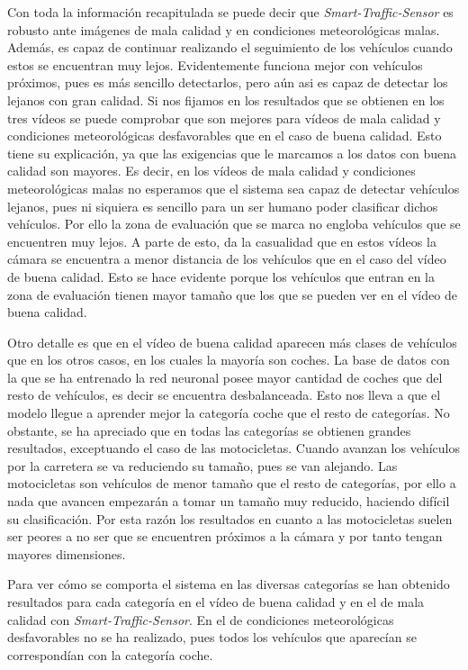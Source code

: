 Con toda la información recapitulada se puede decir que \textit{Smart-Traffic-Sensor} es robusto ante imágenes de mala calidad y en condiciones meteorológicas malas. Además, es capaz de continuar realizando el seguimiento de los vehículos cuando estos se encuentran muy lejos.
Evidentemente funciona mejor con vehículos próximos, pues es más sencillo detectarlos, pero aún asi es  capaz de detectar los lejanos con gran calidad. 
Si nos fijamos en los resultados que se obtienen en los tres vídeos se puede comprobar que son mejores para vídeos de mala calidad y condiciones meteorológicas desfavorables que en el caso de buena calidad. Esto tiene su explicación, ya que las exigencias que le marcamos a los datos con buena calidad son mayores. Es decir, en los vídeos de mala calidad y condiciones meteorológicas malas  no esperamos que el sistema sea capaz de detectar vehículos lejanos, pues ni siquiera es sencillo para un ser humano poder clasificar dichos vehículos. Por ello la zona de evaluación que se marca no engloba vehículos que se encuentren muy lejos. A parte de esto, da la casualidad que en estos vídeos la cámara se encuentra a menor distancia de los vehículos que en el caso del vídeo de buena calidad. Esto se hace evidente porque los vehículos que entran en la zona de evaluación tienen mayor tamaño que los que se pueden ver en el vídeo de buena calidad.

Otro detalle es que en el vídeo de buena calidad aparecen más clases de vehículos que en los otros casos, en los cuales la mayoría son coches. La base de datos con la que se ha entrenado la red neuronal posee mayor cantidad de coches que del resto de vehículos, es decir se encuentra desbalanceada. Esto nos lleva a que el modelo llegue a aprender mejor la categoría coche que el resto de categorías. No obstante, se ha apreciado que en todas las categorías se obtienen grandes resultados, exceptuando el caso de las motocicletas. Cuando avanzan los vehículos por la carretera se va reduciendo su tamaño, pues se van alejando. Las motocicletas son vehículos de menor tamaño que el resto de categorías, por ello a nada que avancen empezarán a tomar un tamaño muy reducido, haciendo difícil su clasificación. Por esta razón los resultados en cuanto a las motocicletas suelen ser peores a no ser que se encuentren próximos a la cámara y por tanto tengan mayores dimensiones.

Para ver cómo se comporta el sistema en las diversas categorías se han obtenido resultados para cada categoría en el vídeo de buena calidad y en el de mala calidad con \textit{Smart-Traffic-Sensor}. En el de condiciones meteorológicas desfavorables no se ha realizado, pues todos los vehículos que aparecían se correspondían con la categoría coche.

